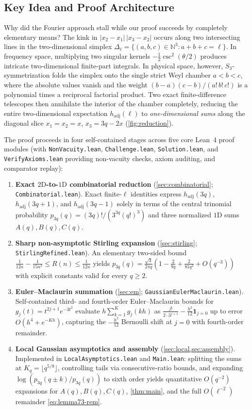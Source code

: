 \documentclass[11pt,a4paper]{article}
\numberwithin{equation}{section}
\theoremstyle{plain}
\theoremstyle{definition}
\theoremstyle{remark}
\newcommand{\N}{\mathbb{N}}
\newcommand{\hadj}{h_{\mathrm{adj}}}
\newcommand{\code}[1]{\texttt{\small #1}}
\begin{document}
\subsection{Key Idea and Proof Architecture}

Why did the Fourier approach stall while our proof succeeds by completely elementary means? The kink in $|x_2-x_1|\,|x_3-x_2|$ occurs along two intersecting lines in the two-dimensional simplex $\Delta_\ell=\{(a,b,c)\in\N^3:a+b+c=\ell\}$. In frequency space, multiplying two singular kernels $-\frac{1}{2}\csc^2(\theta/2)$ produces intricate two-dimensional finite-part integrals. In physical space, however, $S_3$-symmetrization folds the simplex onto the single strict Weyl chamber $a<b<c$, where the absolute values vanish and the weight $(b-a)(c-b)/(a!\,b!\,c!)$ is a polynomial times a reciprocal factorial product. Two exact finite-difference telescopes then annihilate the interior of the chamber completely, reducing the entire two-dimensional expectation $\hadj(\ell)$ to \emph{one-dimensional sums} along the diagonal slice $x_1=x_2=x$, $x_3=3q-2x$ (\cref{fig:reduction}).

The proof proceeds in four self-contained stages across five core Lean~4 proof modules (with \code{NonVacuity.lean}, \code{Challenge.lean}, \code{Solution.lean}, and \code{VerifyAxioms.lean} providing non-vacuity checks, axiom auditing, and comparator replay):
\begin{enumerate}[label=\textbf{Stage \arabic*.},leftmargin=*,align=left]
  \item \textbf{Exact $2\mathrm{D}$-to-$1\mathrm{D}$ combinatorial reduction} (\cref{sec:combinatorial}; \code{Combinatorial.lean}). Exact finite-$\ell$ identities express $\hadj(3q)$, $\hadj(3q+1)$, and $\hadj(3q-1)$ solely in terms of the central trinomial probability $p_{3q}(q)=(3q)!/(3^{3q}(q!)^3)$ and three normalized $1\mathrm{D}$ sums $A(q),B(q),C(q)$.
  \item \textbf{Sharp non-asymptotic Stirling expansion} (\cref{sec:stirling}; \code{StirlingRefined.lean}). An elementary two-sided bound $\frac{1}{12n}-\frac{1}{15n^3}\le R(n)\le\frac{1}{12n}$ yields $p_{3q}(q)=\frac{\sqrt{3}}{2\pi q}(1-\frac{2}{9q}+\frac{2}{81q^2}+O(q^{-3}))$ with explicit constants valid for every $q\ge 2$.
  \item \textbf{Euler--Maclaurin summation} (\cref{sec:em}; \code{GaussianEulerMaclaurin.lean}). Self-contained third- and fourth-order Euler--Maclaurin bounds for $g_j(t)=t^{2j+1}e^{-3t^2}$ evaluate $h\sum_{k=1}^{K}g_j(kh)$ as $\frac{j!}{2\cdot 3^{j+1}}-\frac{h^2}{12}\mathbf{1}_{j=0}$ up to error $O(h^4+e^{-Kh})$, capturing the $-\frac{h^2}{12}$ Bernoulli shift at $j=0$ with fourth-order remainder.
  \item \textbf{Local Gaussian asymptotics and assembly} (\cref{sec:local,sec:assembly}). Implemented in \code{LocalAsymptotics.lean} and \code{Main.lean}: splitting the sums at $K_q=\lfloor q^{5/8}\rfloor$, controlling tails via consecutive-ratio bounds, and expanding $\log(p_{3q}(q\pm k)/p_{3q}(q))$ to sixth order yields quantitative $O(q^{-2})$ expansions for $A(q),B(q),C(q)$, \cref{thm:main}, and the full $O(\ell^{-2})$ remainder \eqref{eq:lemma73-rem}.
\end{enumerate}
\end{document}
